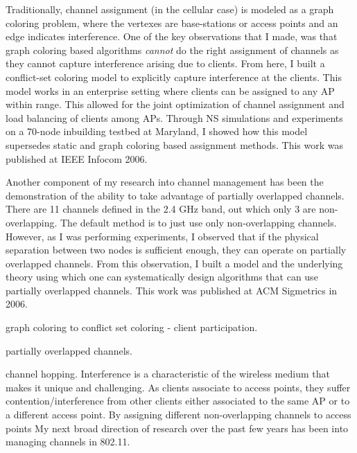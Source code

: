 \documentclass[11pt,letterpaper]{article}
\begin{document}
Traditionally, channel assignment (in the cellular case) is modeled as a graph coloring problem, where the vertexes are
base-stations or access points and an edge indicates interference. One of the key observations that I made, was that
graph coloring based algorithms {\it cannot} do the right assignment of channels as they cannot capture interference
arising due to clients. From here, I built a conflict-set coloring model to explicitly capture interference at the
clients. This model works in an enterprise setting where clients can be assigned to any AP within range. This allowed
for the joint optimization of channel assignment and load balancing of clients among APs. Through NS simulations and
experiments on a 70-node inbuilding testbed at Maryland, I showed how this model supersedes static and graph coloring
based assignment methods. This work was published at IEEE Infocom 2006. 

Another component of my research into channel management has been the demonstration of the ability to take
advantage of partially overlapped channels. There are 11 channels defined in the 2.4 GHz band, out which only
3 are non-overlapping. The default method is to just use only non-overlapping channels. However, as I was performing
experiments, I observed that if the physical separation between two nodes is sufficient enough, they can operate on
partially overlapped channels. From this observation, I built a model and the underlying theory using which one
can systematically design algorithms that can use partially overlapped channels. This work was published at 
ACM Sigmetrics in 2006.  
 
graph coloring to conflict set coloring - client participation.

partially overlapped channels.

channel hopping.
Interference is a characteristic of the wireless medium that makes it unique and challenging. As clients associate
to access points, they suffer contention/interference from other clients either associated to the same AP  
or to a different access point. By assigning different non-overlapping channels to access points
 My next broad direction
of research over the past few years has been into managing channels in 802.11. 
\end{document}
